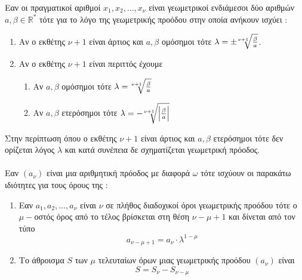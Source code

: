 \documentclass[twoside,nofonts,internet,shmeiwseis]{thewria}
\DeclareRobustCommand{\frac}[3][0pt]{%
{\begingroup\hspace{#1}#2\hspace{#1}\endgroup\over\hspace{#1}#3\hspace{#1}}}
\begin{document}
Εαν οι πραγματικοί αριθμοί $ x_1,x_2,\ldots,x_\nu $ είναι γεωμετρικοί ενδιάμεσοι δύο αριθμών $ a,\beta\in\mathbb{R}^*$ τότε για το λόγο της γεωμετρικής προόδου στην οποία ανήκουν ισχύει :
\begin{enumerate}[itemsep=0mm]
\item Αν ο εκθέτης $ \nu+1 $ είναι άρτιος και $ a,\beta $ ομόσημοι τότε $ \lambda=\pm\!\sqrt[\nu+1]{\frac{\beta}{a}} $.
\item Αν ο εκθέτης $ \nu+1 $ είναι περιττός έχουμε
\begin{enumerate}[itemsep=0mm,label=\roman*.]
\item Αν $ a,\beta $ ομόσημοι τότε $ \lambda=\!\sqrt[\nu+1]{\frac{\beta}{a}} $
\item Αν $ a,\beta $ ετερόσημοι τότε $ \lambda=-\!\sqrt[\nu+1]{\left| \frac{\beta}{a}\right| } $
\end{enumerate}
\end{enumerate}
Στην περίπτωση όπου ο εκθέτης $ \nu+1 $ είναι άρτιος και $ a,\beta $ ετερόσημοι τότε δεν ορίζεται λόγος $ \lambda $ και κατά συνέπεια δε σχηματίζεται γεωμετρική πρόοδος.\\\\
Εαν $ (a_\nu) $ είναι μια αριθμητική πρόοδος με διαφορά $ \omega $ τότε ισχύουν οι παρακάτω ιδιότητες για τους όρους της :
\begin{enumerate}[itemsep=0mm,label=\roman*.]
\item Εαν $ a_1,a_2,\ldots,a_\nu $ είναι $ \nu $ σε πλήθος διαδοχικοί όροι γεωμετρικής προόδου τότε ο $ \mu -$οστός όρος από το τέλος βρίσκεται στη θέση $ \nu-\mu+1 $ και δίνεται από τον τύπο \[ a_{\nu-\mu+1}=a_\nu\cdot\lambda^{1-\mu} \]
\item Το άθροισμα $ S $ των $ \mu $ τελευταίων όρων μιας γεωμετρικής προόδου $ (a_\nu) $ είναι \[ S=S_\nu-S_{\nu-\mu} \]
\end{enumerate}
\end{document}
